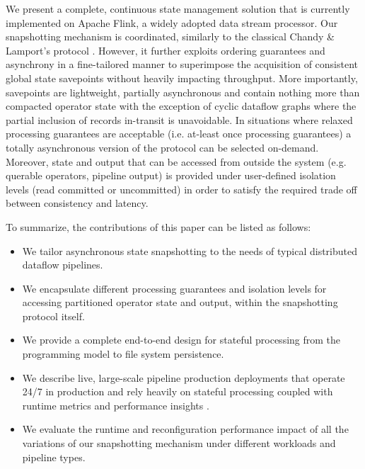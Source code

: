 We present a complete, continuous state management solution that is currently implemented on Apache Flink, a widely adopted data stream processor. Our snapshotting mechanism is coordinated, similarly to the classical Chandy \& Lamport's protocol \cite{chandy1985distributed}. However, it further exploits ordering guarantees and asynchrony in a fine-tailored manner to superimpose the acquisition of consistent global state savepoints without heavily impacting throughput. More importantly, savepoints are lightweight, partially asynchronous and contain nothing more than compacted operator state with the exception of cyclic dataflow graphs where the partial inclusion of records in-transit is unavoidable. In situations where relaxed processing guarantees are acceptable (i.e. at-least once processing guarantees) a totally asynchronous version of the protocol can be selected on-demand. Moreover, state and output that can be accessed from outside the system (e.g. querable operators, pipeline output) is provided under user-defined isolation levels (read committed or uncommitted) in order to satisfy the required trade off between consistency and latency.

To summarize, the contributions of this paper can be listed as follows:

\begin{itemize}
	\item We tailor asynchronous state snapshotting to the needs of typical distributed dataflow pipelines.
	\item We encapsulate different processing guarantees and isolation levels for accessing partitioned operator state and output, within the snapshotting protocol itself.
	\item We provide a complete end-to-end design for stateful processing from the programming model to file system persistence.
	\item We describe live, large-scale pipeline production deployments that operate 24/7 in production and rely heavily on stateful processing coupled with runtime metrics and performance insights .
	\item We evaluate the runtime and reconfiguration performance impact of all the variations of our snapshotting mechanism under different workloads and pipeline types.
\end{itemize}


